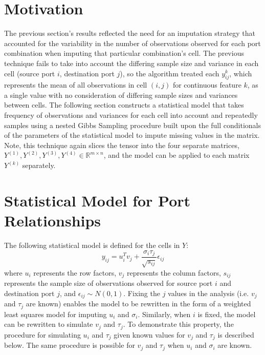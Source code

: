 \documentclass[12pt,twoside]{dukestatscithesis}
\theoremstyle{definition}
\theoremstyle{definition}
\theoremstyle{definition}
\theoremstyle{remark}
\begin{document}
\section{Motivation}\label{motivation-2}

The previous section's results reflected the need for an imputation
strategy that accounted for the variability in the number of
observations observed for each port combination when imputing that
particular combination's cell. The previous technique fails to take into
account the differing sample size and variance in each cell (source port
\(i\), destination port \(j\)), so the algorithm treated each
\(y_{ij}^{k}\), which represents the mean of all observations in cell
\((i,j)\) for continuous feature \(k\), as a single value with no
consideration of differing sample sizes and variances between cells. The
following section constructs a statistical model that takes frequency of
observations and variances for each cell into account and repeatedly
samples using a nested Gibbs Sampling procedure built upon the full
conditionals of the parameters of the statistical model to impute
missing values in the matrix. Note, this technique again slices the
tensor into the four separate matrices,
\(Y^{(1)}, Y^{(2)}, Y^{(3)}, Y^{(4)} \in \mathbb{R}^{m \times n}\), and
the model can be applied to each matrix \(Y^{(k)}\) separately.

\section{Statistical Model for Port
Relationships}\label{statistical-model-for-port-relationships}

The following statistical model is defined for the cells in \(Y\):
\[y_{ij} = u_i^Tv_j + \frac{\sigma_i \tau_j}{\sqrt{s_{ij}}}\epsilon_{ij}\]
where \(u_i\) represents the row factors, \(v_j\) represents the column
factors, \(s_{ij}\) represents the sample size of observations observed
for source port \(i\) and destination port \(j\), and
\(\epsilon_{ij} \sim N(0,1)\). Fixing the \(j\) values in the analysis
(i.e. \(v_j\) and \(\tau_j\) are known) enables the model to be
rewritten in the form of a weighted least squares model for imputing
\(u_i\) and \(\sigma_i\). Similarly, when \(i\) is fixed, the model can
be rewritten to simulate \(v_j\) and \(\tau_j\). To demonstrate this
property, the procedure for simulating \(u_i\) and \(\tau_j\) given
known values for \(v_j\) and \(\tau_j\) is described below. The same
procedure is possible for \(v_j\) and \(\tau_j\) when \(u_i\) and
\(\sigma_i\) are known.
\end{document}
